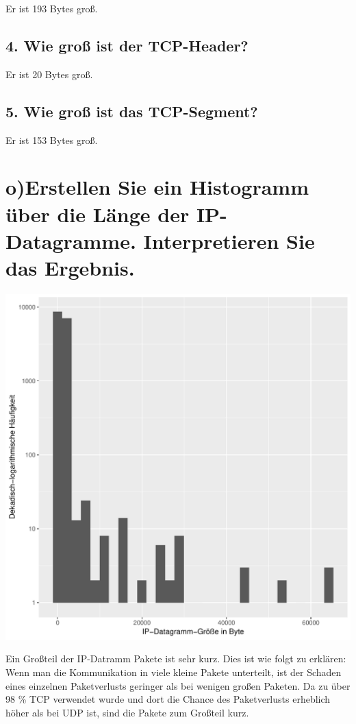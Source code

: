 \documentclass[a4paper, 11pt, fleqn, notitlepage, egregdoesnotlikesansseriftitles]{scrartcl}
\begin{document}
Er ist 193 Bytes groß.

\subsection{4. Wie groß ist der TCP-Header?}

Er ist 20 Bytes groß.

\subsection{5. Wie groß ist das TCP-Segment?}

Er ist 153 Bytes groß.

\section{o)Erstellen Sie ein Histogramm über die Länge der IP-Datagramme. Interpretieren Sie das Ergebnis.}

\begin{center}
    \includegraphics[width=\textwidth]{length_all}
    \label{fig:hist:all}
\end{center}
Ein Großteil der IP-Datramm Pakete ist sehr kurz. Dies ist wie folgt zu erklären: Wenn man die Kommunikation in viele kleine Pakete unterteilt, ist der Schaden eines einzelnen Paketverlusts geringer als bei wenigen großen Paketen. Da zu über 98 \% TCP verwendet wurde und dort die Chance des Paketverlusts erheblich höher als bei UDP ist, sind die Pakete zum Großteil kurz.
\end{document}
